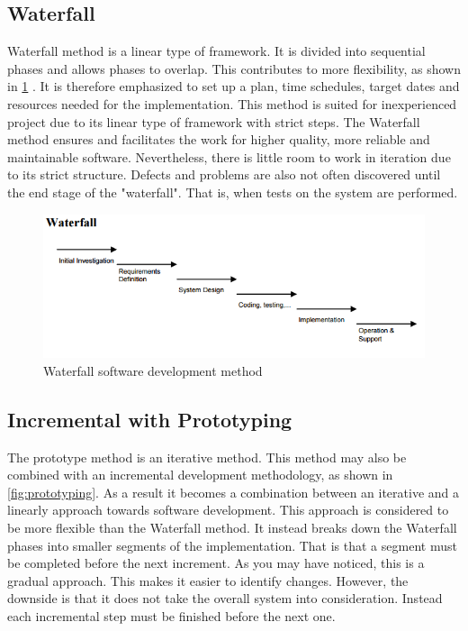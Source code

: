 \documentclass[a4paper,11pt]{kth-mag}
\begin{document}
\subsection{Waterfall}
Waterfall method is a linear type of framework.
It is divided into sequential phases and allows phases to overlap.
This contributes to more flexibility, as shown in \cref{fig:waterfall} \cite{rep:devmethod}.
It is therefore emphasized to set up a plan, time schedules, target dates and resources needed for the implementation.
This method is suited for inexperienced project due to its linear type of framework with strict steps.
The Waterfall method ensures and facilitates the work for higher quality, more reliable and maintainable software.
Nevertheless, there is little room to work in iteration due to its strict structure.
Defects and problems are also not often discovered until the end stage of the "waterfall".
That is, when tests on the system are performed.

\begin{figure}[h!]
    \centering
    \includegraphics[scale=0.8]{waterfall.png}
    \caption{Waterfall software development method \cite{rep:devmethod}}
    \label{fig:waterfall}
\end{figure}

\subsection{Incremental with Prototyping}
The prototype method is an iterative method.
This method may also be combined with an incremental development methodology, as shown in \cref{fig:prototyping}.
As a result it becomes a combination between an iterative and a linearly approach towards software development.
This approach is considered to be more flexible than the Waterfall method.
It instead breaks down the Waterfall phases into smaller segments of the implementation.
That is that a segment must be completed before the next increment.
As you may have noticed, this is a gradual approach.
This makes it easier to identify changes.
However, the downside is that it does not take the overall system into consideration.
Instead each incremental step must be finished before the next one.
\end{document}
